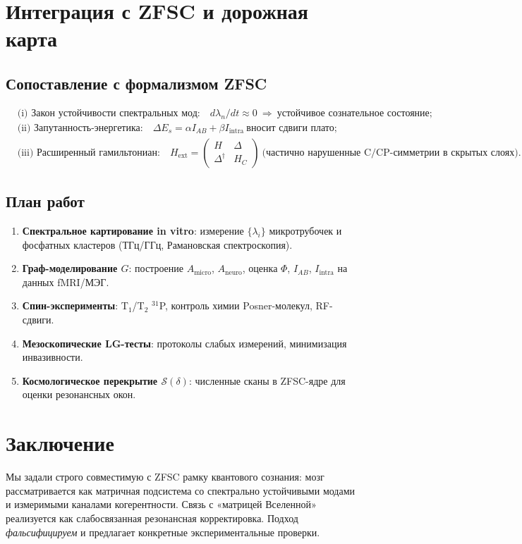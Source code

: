 \documentclass[12pt,a4paper]{article}
\begin{document}
\section{Интеграция с ZFSC и дорожная карта}
\subsection*{Сопоставление с формализмом ZFSC}
\begin{align}
&\text{(i) Закон устойчивости спектральных мод:}\quad d\lambda_n/dt \approx 0 \ \Rightarrow \ \text{устойчивое сознательное состояние};\\
&\text{(ii) Запутанность-энергетика:}\quad \Delta E_s=\alpha I_{AB}+\beta I_{\text{intra}} \ \text{вносит сдвиги плато;}\\
&\text{(iii) Расширенный гамильтониан:}\quad
H_{\text{ext}}=\begin{pmatrix}H & \Delta \\ \Delta^\dagger & H_C\end{pmatrix}
\ \text{(частично нарушенные C/CP-симметрии в скрытых слоях)}.
\end{align}

\subsection*{План работ}
\begin{enumerate}
\item \textbf{Спектральное картирование in vitro}: измерение $\{\lambda_i\}$ микротрубочек и фосфатных кластеров (ТГц/ГГц, Рамановская спектроскопия).
\item \textbf{Граф-моделирование $G$}: построение $A_{\text{micro}}$, $A_{\text{neuro}}$, оценка $\Phi$, $I_{AB}$, $I_{\text{intra}}$ на данных fMRI/МЭГ.
\item \textbf{Спин-эксперименты}: T$_1$/T$_2$ $^{31}$P, контроль химии Posner-молекул, RF-сдвиги.
\item \textbf{Мезоскопические LG-тесты}: протоколы слабых измерений, минимизация инвазивности.
\item \textbf{Космологическое перекрытие $\mathcal{S}(\delta)$}: численные сканы в ZFSC-ядре для оценки резонансных окон.
\end{enumerate}

\section*{Заключение}
Мы задали строго совместимую с ZFSC рамку квантового сознания: мозг рассматривается как матричная подсистема со спектрально устойчивыми модами и измеримыми каналами когерентности. Связь с «матрицей Вселенной» реализуется как слабосвязанная резонансная корректировка. Подход \emph{фальсифицируем} и предлагает конкретные экспериментальные проверки.
\end{document}
